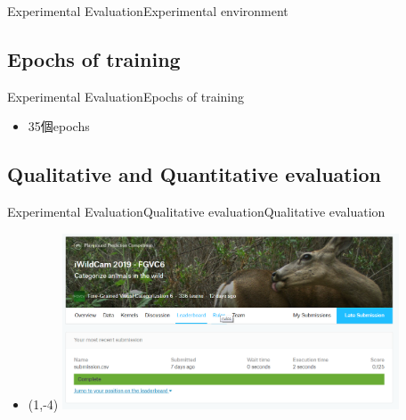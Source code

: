 \documentclass{beamer}
\begin{document}
\begin{CJK}{UTF8}{}
\begin{frame}{Experimental Evaluation}{Experimental environment}
\begin{itemize}
{	}
	\end{itemize}
\end{frame}

\subsection{Epochs of training}

\begin{frame}{Experimental Evaluation}{Epochs of training}
	\begin{itemize}
	\item{
		35個epochs
	}
	\end{itemize}
\end{frame}

\subsection{Qualitative and Quantitative evaluation}

\begin{frame}{Experimental Evaluation}{Qualitative evaluationQualitative evaluation}
	\begin{itemize}
	\item{
		\begin{textblock}{3}(1,-4)
		\includegraphics[width=10cm]{sorce.png}
		\end{textblock}
	}
	\end{itemize}
\end{frame}

\end{CJK}
\end{document}
